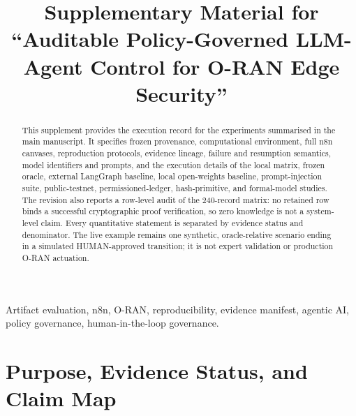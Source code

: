 \documentclass[journal]{IEEEtran}
\begin{document}
\title{Supplementary Material for\\
``Auditable Policy-Governed LLM-Agent Control for O-RAN Edge Security''}

\author{

}

\maketitle

\begin{abstract}
This supplement provides the execution record for the experiments summarised
in the main manuscript. It specifies frozen provenance, computational
environment, full n8n canvases, reproduction protocols, evidence lineage,
failure and resumption semantics, model identifiers and prompts, and the
execution details of the local matrix, frozen oracle, external LangGraph
baseline, local open-weights baseline, prompt-injection suite, public-testnet,
permissioned-ledger, hash-primitive, and formal-model studies. The revision
also reports a row-level audit of the 240-record matrix: no retained row binds
a successful cryptographic proof verification, so zero knowledge is not a
system-level claim. Every quantitative statement is separated by evidence
status and denominator. The live example remains one synthetic,
oracle-relative scenario ending in a simulated HUMAN-approved transition; it
is not expert validation or production O-RAN actuation.
\end{abstract}

\begin{IEEEkeywords}
Artifact evaluation, n8n, O-RAN, reproducibility, evidence manifest,
agentic AI, policy governance, human-in-the-loop governance.
\end{IEEEkeywords}

\section{Purpose, Evidence Status, and Claim Map}
\label{sec:roadmap}
\end{document}
